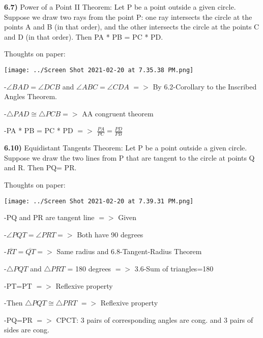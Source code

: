 \documentclass{article}
\begin{document}
\textbf{6.7)} Power of a Point II Theorem: Let P be a point outside a given circle. Suppose we draw two rays from the point P: one ray intersects the circle at the points A and B (in that order), and the other intersects the circle at the points C and D (in that order). Then PA * PB = PC * PD.

\vspace{2mm}

Thoughts on paper:

\vspace{2mm}

\texttt{[image: ../Screen Shot 2021-02-20 at 7.35.38 PM.png]}



\vspace{2mm}

-$\angle BAD=\angle DCB$ and $\angle ABC=\angle CDA$ $=>$ By 6.2-Corollary to the Inscribed Angles Theorem.

\vspace{2mm}

-$\triangle PAD \cong \triangle PCB => $ AA congruent theorem 

\vspace{2mm}

-PA * PB = PC * PD $=>$ $\frac{PA}{PC}=\frac{PD}{PB}$


\newpage

\textbf{6.10)} Equidistant Tangents Theorem: Let P be a point outside a given circle. Suppose we draw the two lines from P that are tangent to the circle at points Q and R. Then PQ= PR.

\vspace{2mm}

Thoughts on paper:

\vspace{2mm}

\texttt{[image: ../Screen Shot 2021-02-20 at 7.39.31 PM.png]}

\vspace{2mm}


-PQ and PR are tangent line $=>$ Given

\vspace{2mm}

-$\angle PQT = \angle PRT =>$ Both have 90 degrees

\vspace{2mm}

-$\overline{RT}=\overline{QT} =>$ Same radius and 6.8-Tangent-Radius Theorem 

\vspace{2mm}

-$\triangle PQT$ and $\triangle PRT$ = 180 degrees $=>$ 3.6-Sum of triangles=180

\vspace{2mm}

-PT=PT $=>$ Reflexive property

\vspace{2mm}

-Then $\triangle PQT \cong \triangle PRT$ $=>$ Reflexive property

\vspace{2mm}

-PQ=PR $=>$ CPCT: 3 pairs of corresponding angles are cong. and 3 pairs of sides are cong. 
\end{document}
